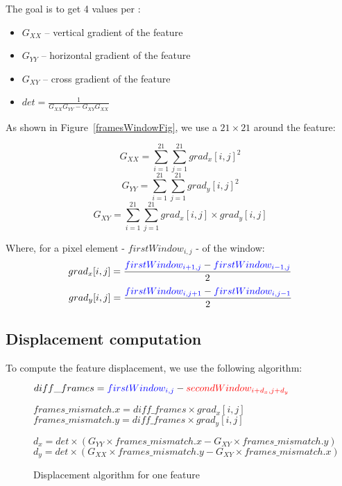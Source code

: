 The goal is to get 4 values per \feat{}:
\begin{itemize}
	\item $G_{XX}$ -- vertical gradient of the feature
	\item $G_{YY}$ -- horizontal gradient of the feature
	\item $G_{XY}$ -- cross gradient of the feature
	\item $det = \frac{1}{G_{XX}G_{YY}-G_{XY}G_{XX}}$
\end{itemize}

As shown in Figure~\ref{framesWindowFig}, we use a $21\times21$  around the feature:

$$G_{XX} = \sum_{i=1}^{21}\sum_{j=1}^{21} grad_{x}[i,j]^{2}$$
$$G_{YY} = \sum_{i=1}^{21}\sum_{j=1}^{21} grad_{y}[i,j]^{2}$$
$$G_{XY} = \sum_{i=1}^{21}\sum_{j=1}^{21} grad_{x}[i,j]\times grad_{y}[i,j]$$

Where, for a pixel element - $firstWindow_{i,j}$ -  of the window:
$$grad_{x}[i,j] = \frac{\textcolor{blue}{firstWindow_{i+1,j}} - \textcolor{blue}{firstWindow_{i-1,j}}}{2}$$
$$grad_{y}[i,j] = \frac{\textcolor{blue}{firstWindow_{i,j+1}} - \textcolor{blue}{firstWindow_{i,j-1}}}{2}$$


\subsection{Displacement computation}

To compute the feature displacement, we use the following algorithm:

\begin{figure}[!htbp]
\begin{algorithmic}

	\State $diff\_frames = \textcolor{blue}{firstWindow_{i,j}} - \textcolor{red}{secondWindow_{i+d_{x},j+d_{y}}}$

	\State $frames\_mismatch.x = diff\_frames\times grad_{x}[i,j]$
	\State $frames\_mismatch.y = diff\_frames\times grad_{y}[i,j]$

	\EndFor

	\State $d_{x} = det\times (G_{YY}\times frames\_mismatch.x - G_{XY}\times frames\_mismatch.y)$
	\State $d_{y} = det\times (G_{XX}\times frames\_mismatch.y - G_{XY}\times frames\_mismatch.x)$
\end{algorithmic}
\caption{Displacement algorithm for one feature}
\label{algoFig}
\end{figure}
\FloatBarrier

